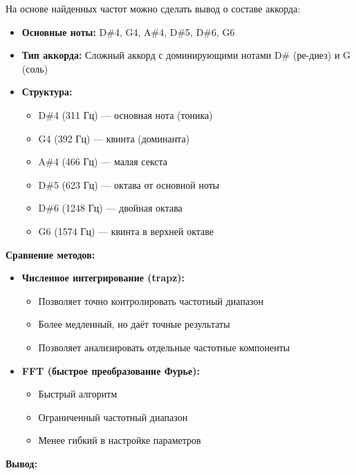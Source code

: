 На основе найденных частот можно сделать вывод о составе аккорда:

\begin{itemize}
    \item \textbf{Основные ноты:} D\#4, G4, A\#4, D\#5, D\#6, G6
    \item \textbf{Тип аккорда:} Сложный аккорд с доминирующими нотами D\# (ре-диез) и G (соль)
    \item \textbf{Структура:}
    \begin{itemize}
        \item D\#4 (311 Гц) — основная нота (тоника)
        \item G4 (392 Гц) — квинта (доминанта)
        \item A\#4 (466 Гц) — малая секста
        \item D\#5 (623 Гц) — октава от основной ноты
        \item D\#6 (1248 Гц) — двойная октава
        \item G6 (1574 Гц) — квинта в верхней октаве
    \end{itemize}
\end{itemize}

\textbf{Сравнение методов:}

\begin{itemize}
    \item \textbf{Численное интегрирование (trapz):}
    \begin{itemize}
        \item Позволяет точно контролировать частотный диапазон
        \item Более медленный, но даёт точные результаты
        \item Позволяет анализировать отдельные частотные компоненты
    \end{itemize}
    
    \item \textbf{FFT (быстрое преобразование Фурье):}
    \begin{itemize}
        \item Быстрый алгоритм
        \item Ограниченный частотный диапазон
        \item Менее гибкий в настройке параметров
    \end{itemize}
\end{itemize}

\textbf{Вывод:}

